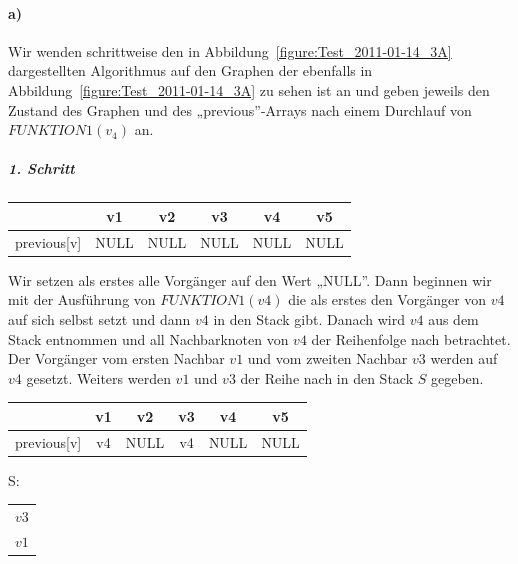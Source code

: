 \documentclass[a4paper, 12pt]{article}
\begin{document}
\paragraph{a)}

Wir wenden schrittweise den in Abbildung~\ref{figure:Test_2011-01-14_3A}
dargestellten Algorithmus auf den Graphen der ebenfalls in
Abbildung~\ref{figure:Test_2011-01-14_3A} zu sehen ist an und geben jeweils
den Zustand des Graphen und des „previous”-Arrays nach einem Durchlauf von
$FUNKTION1(v_4)$ an.

\subparagraph{1. Schritt}

\begin{center}
	\begin{tabular}{lccccc}
					& v1	& v2	& v3	& v4	& v5\\
		\hline
		previous[v] & NULL	& NULL	& NULL	& NULL	&  NULL
	\end{tabular}
\end{center}

Wir setzen als erstes alle Vorgänger auf den Wert „NULL”. Dann beginnen wir
mit der Ausführung von $FUNKTION1(v4)$ die als erstes den Vorgänger von $v4$
auf sich selbst setzt und dann $v4$ in den Stack gibt. Danach wird $v4$ aus
dem Stack entnommen und all Nachbarknoten von $v4$ der Reihenfolge nach
betrachtet.\\

Der Vorgänger vom ersten Nachbar $v1$ und vom zweiten Nachbar $v3$ werden auf
$v4$ gesetzt. Weiters werden $v1$ und $v3$ der Reihe nach in den Stack $S$
gegeben.\\

\begin{minipage}[b]{0.7\linewidth}
	\begin{center}
		\begin{tabular}{lccccc}
						& v1	& v2	& v3	& v4	& v5\\
			\hline
			previous[v] & v4	& NULL	& v4	& NULL	&  NULL
		\end{tabular}
	\end{center}
\end{minipage}
\begin{minipage}[b]{0.15\linewidth}
	\flushright S:~
\end{minipage}
\begin{minipage}[b]{0.15\linewidth}
	\begin{tabular}{|c|}
		$v3$\\
		$v1$\\
		\hline
	\end{tabular}
\end{minipage}\\
\end{document}
